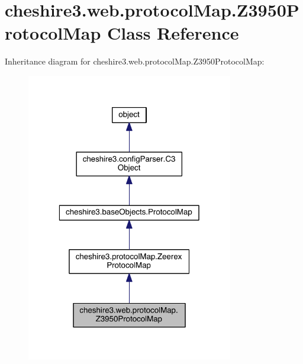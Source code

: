 \hypertarget{classcheshire3_1_1web_1_1protocol_map_1_1_z3950_protocol_map}{\section{cheshire3.\-web.\-protocol\-Map.\-Z3950\-Protocol\-Map Class Reference}
\label{classcheshire3_1_1web_1_1protocol_map_1_1_z3950_protocol_map}
}


Inheritance diagram for cheshire3.\-web.\-protocol\-Map.\-Z3950\-Protocol\-Map\-:
\nopagebreak
\begin{figure}[H]
\begin{center}
\leavevmode
\includegraphics[width=256pt]{classcheshire3_1_1web_1_1protocol_map_1_1_z3950_protocol_map__inherit__graph}
\end{center}
\end{figure}


